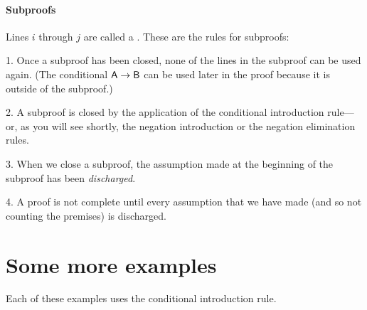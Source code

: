 \paragraph{Subproofs} Lines $i$ through $j$ are called a . These are the rules for subproofs:

\begin{earg}
\item[1.] Once a subproof has been closed, none of the lines in the subproof can be used again. (The conditional $\mathsf{A}\rightarrow\mathsf{B}$ can be used later in the proof because it is outside of the subproof.)
\item[2.] A subproof is closed by the application of the conditional introduction rule---or, as you will see shortly, the negation introduction or the negation elimination rules.
\item[3.] When we close a subproof, the assumption made at the beginning of the subproof has been \textit{discharged}.
\item[4.] A proof is not complete until every assumption that we have made (and so not counting the premises) is discharged.
\end{earg}


\section{Some more examples}

Each of these examples uses the conditional introduction rule.

